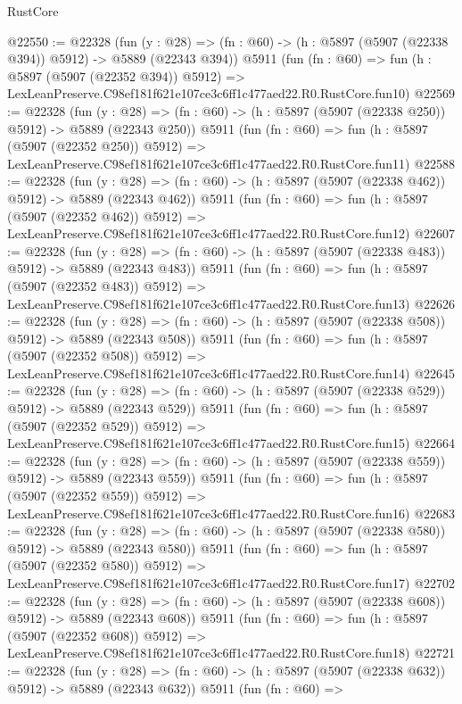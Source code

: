 \begin{lexlean}{RustCore}
\begin{coremodule}
@22550 := @22328
    (fun (y : @28) => (fn : @60) -> (h : @5897 (@5907 (@22338 @394)) @5912) -> @5889 (@22343 @394))
    @5911
    (fun (fn : @60) =>
    fun (h : @5897 (@5907 (@22352 @394)) @5912) =>
    LexLeanPreserve.C98ef181f621e107ce3c6ff1c477aed22.R0.RustCore.fun10)
@22569 := @22328
    (fun (y : @28) => (fn : @60) -> (h : @5897 (@5907 (@22338 @250)) @5912) -> @5889 (@22343 @250))
    @5911
    (fun (fn : @60) =>
    fun (h : @5897 (@5907 (@22352 @250)) @5912) =>
    LexLeanPreserve.C98ef181f621e107ce3c6ff1c477aed22.R0.RustCore.fun11)
@22588 := @22328
    (fun (y : @28) => (fn : @60) -> (h : @5897 (@5907 (@22338 @462)) @5912) -> @5889 (@22343 @462))
    @5911
    (fun (fn : @60) =>
    fun (h : @5897 (@5907 (@22352 @462)) @5912) =>
    LexLeanPreserve.C98ef181f621e107ce3c6ff1c477aed22.R0.RustCore.fun12)
@22607 := @22328
    (fun (y : @28) => (fn : @60) -> (h : @5897 (@5907 (@22338 @483)) @5912) -> @5889 (@22343 @483))
    @5911
    (fun (fn : @60) =>
    fun (h : @5897 (@5907 (@22352 @483)) @5912) =>
    LexLeanPreserve.C98ef181f621e107ce3c6ff1c477aed22.R0.RustCore.fun13)
@22626 := @22328
    (fun (y : @28) => (fn : @60) -> (h : @5897 (@5907 (@22338 @508)) @5912) -> @5889 (@22343 @508))
    @5911
    (fun (fn : @60) =>
    fun (h : @5897 (@5907 (@22352 @508)) @5912) =>
    LexLeanPreserve.C98ef181f621e107ce3c6ff1c477aed22.R0.RustCore.fun14)
@22645 := @22328
    (fun (y : @28) => (fn : @60) -> (h : @5897 (@5907 (@22338 @529)) @5912) -> @5889 (@22343 @529))
    @5911
    (fun (fn : @60) =>
    fun (h : @5897 (@5907 (@22352 @529)) @5912) =>
    LexLeanPreserve.C98ef181f621e107ce3c6ff1c477aed22.R0.RustCore.fun15)
@22664 := @22328
    (fun (y : @28) => (fn : @60) -> (h : @5897 (@5907 (@22338 @559)) @5912) -> @5889 (@22343 @559))
    @5911
    (fun (fn : @60) =>
    fun (h : @5897 (@5907 (@22352 @559)) @5912) =>
    LexLeanPreserve.C98ef181f621e107ce3c6ff1c477aed22.R0.RustCore.fun16)
@22683 := @22328
    (fun (y : @28) => (fn : @60) -> (h : @5897 (@5907 (@22338 @580)) @5912) -> @5889 (@22343 @580))
    @5911
    (fun (fn : @60) =>
    fun (h : @5897 (@5907 (@22352 @580)) @5912) =>
    LexLeanPreserve.C98ef181f621e107ce3c6ff1c477aed22.R0.RustCore.fun17)
@22702 := @22328
    (fun (y : @28) => (fn : @60) -> (h : @5897 (@5907 (@22338 @608)) @5912) -> @5889 (@22343 @608))
    @5911
    (fun (fn : @60) =>
    fun (h : @5897 (@5907 (@22352 @608)) @5912) =>
    LexLeanPreserve.C98ef181f621e107ce3c6ff1c477aed22.R0.RustCore.fun18)
@22721 := @22328
    (fun (y : @28) => (fn : @60) -> (h : @5897 (@5907 (@22338 @632)) @5912) -> @5889 (@22343 @632))
    @5911
    (fun (fn : @60) =>

\end{coremodule}
\end{lexlean}
